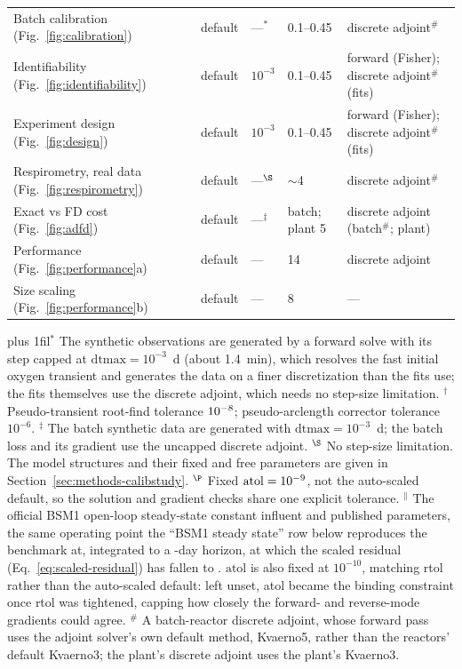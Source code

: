 \documentclass{article}
\begin{document}
\begin{table}[H]
\begin{tabularx}{\linewidth}{>{\raggedright\arraybackslash}X l l l >{\raggedright\arraybackslash}X}
Batch calibration (Fig.~\ref{fig:calibration})         & default & ---$^{\ast}$ & 0.1--0.45 & discrete adjoint$^{\#}$ \\
Identifiability (Fig.~\ref{fig:identifiability})        & default & \(10^{-3}\) & 0.1--0.45 & forward (Fisher); discrete adjoint$^{\#}$ (fits) \\
Experiment design (Fig.~\ref{fig:design})               & default & \(10^{-3}\) & 0.1--0.45 & forward (Fisher); discrete adjoint$^{\#}$ (fits) \\
Respirometry, real data (Fig.~\ref{fig:respirometry})  & default & ---$^{\S}$ & $\sim$4 & discrete adjoint$^{\#}$ \\
Exact vs FD cost (Fig.~\ref{fig:adfd})                 & default & ---$^{\ddagger}$ & batch; plant 5 & discrete adjoint (batch$^{\#}$; plant) \\
Performance (Fig.~\ref{fig:performance}a)              & default & --- & 14 & discrete adjoint \\
Size scaling (Fig.~\ref{fig:performance}b)             & default & --- & 8 & --- \\
\bottomrule
\end{tabularx}
\par\vspace{3pt}
{\footnotesize\leftskip=0pt\rightskip=0pt\parfillskip=0pt plus 1fil\noindent $^{\ast}$ The synthetic observations are generated by a forward solve with its step capped at \(\mathrm{dtmax}=10^{-3}\)~d (about 1.4~min), which resolves the fast initial oxygen transient and generates the data on a finer discretization than the fits use; the fits themselves use the discrete adjoint, which needs no step-size limitation.\quad
$^{\dagger}$ Pseudo-transient root-find tolerance \(10^{-8}\);
pseudo-arclength corrector tolerance \(10^{-6}\).\quad
$^{\ddagger}$ The batch synthetic data are generated with \(\mathrm{dtmax}=10^{-3}\)~d; the batch loss and its gradient use the uncapped discrete adjoint.\quad
$^{\S}$ No step-size limitation. The model structures and their fixed and free parameters are
given in Section~\ref{sec:methods-calibstudy}.\quad
$^{\P}$ Fixed \(\mathrm{atol}=10^{-9}\), not the auto-scaled default, so the solution
and gradient checks share one explicit tolerance.\quad
$^{\|}$ The official BSM1 open-loop steady-state constant influent and
published parameters, the same operating point the ``BSM1 steady state'' row
below reproduces the benchmark at, integrated to a \VerifADFDHorizon-day horizon, at which the
scaled residual (Eq.~\eqref{eq:scaled-residual}) has fallen to \VerifADFDHorizonResid. \(\mathrm{atol}\) is also fixed at
\(10^{-10}\), matching rtol rather than the auto-scaled default: left
unset, atol became the binding constraint once rtol was tightened, capping
how closely the forward- and reverse-mode gradients could agree.\quad
$^{\#}$ A batch-reactor discrete adjoint, whose forward pass uses the adjoint solver's own default method, Kvaerno5, rather than the reactors' default Kvaerno3; the plant's discrete adjoint uses the plant's Kvaerno3.\par}
\end{table}
\end{document}
